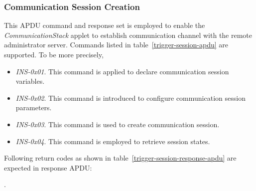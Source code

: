 \subsubsection{Communication Session Creation}\label{secSessionOpen}


This APDU command and response set is employed to enable the \emph{CommunicationStack} applet to establish communication channel with the remote administrator server. Commands listed in table~\ref{trigger-session-apdu} are supported. To be more precisely,
\begin{itemize}
\item \emph{INS-0x01}. This command is applied to declare communication session variables.
\item \emph{INS-0x02}. This command is introduced to configure communication session parameters.
\item \emph{INS-0x03}. This command is used to create communication session.
\item \emph{INS-0x04}. This command is  employed to retrieve session states.
\end{itemize}
\begin{table}[!htb]
\caption{Communication Session Creation Command APDUs}
\label{trigger-session-apdu}
\end{table}


Following return codes as shown in table~\ref{trigger-session-response-apdu} are expected in response APDU:

.\begin{table}[!htb]
\caption{Trigger Session Return Codes}
\label{trigger-session-response-apdu}
\end{table}


